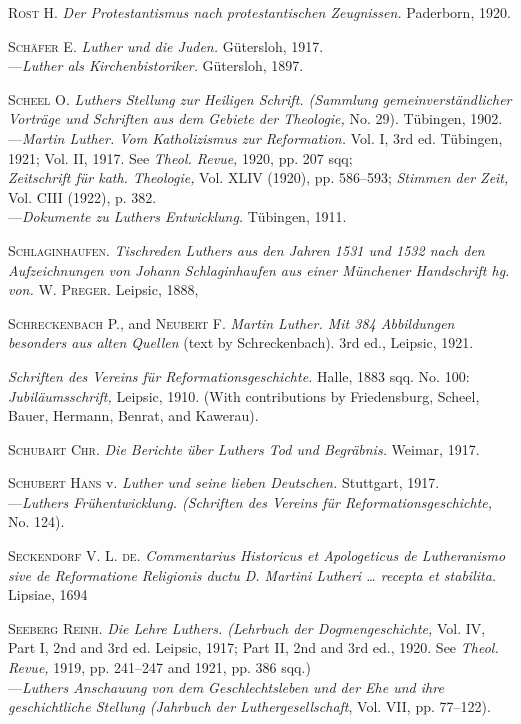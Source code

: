 \textsc{Rost H.} \textit{Der Protestantismus nach protestantischen Zeugnissen.} Paderborn,
1920.

\textsc{Schäfer E.} \textit{Luther und die Juden.} Gütersloh, 1917. \\
---\textit{Luther als Kirchenbistoriker.} Gütersloh, 1897.

\textsc{Scheel O.} \textit{Luthers Stellung zur Heiligen Schrift. (Sammlung gemeinverständlicher Vorträge und Schriften aus dem Gebiete der Theologie,} No.
29). Tübingen, 1902. \\
---\textit{Martin Luther. Vom Katholizismus zur Reformation.} Vol. I, 3rd ed.
Tübingen, 1921; Vol. II, 1917. See \textit{Theol. Revue,} 1920, pp. 207 sqq; \\
\textit{Zeitschrift für kath. Theologie,} Vol. XLIV (1920), pp. 586--593; \textit{Stimmen
der Zeit,} Vol. CIII (1922), p. 382. \\
---\textit{Dokumente zu Luthers Entwicklung.} Tübingen, 1911.

\textsc{Schlaginhaufen.} \textit{Tischreden Luthers aus den Jahren 1531 und 1532 nach
den Aufzeichnungen von Johann Schlaginhaufen aus einer Münchener
Handschrift hg. von.} \textsc{W. Preger.} Leipsic, 1888,

\textsc{Schreckenbach P.}, and \textsc{Neubert F.} \textit{Martin Luther. Mit 384 Abbildungen
besonders aus alten Quellen} (text by Schreckenbach). 3rd ed., Leipsic,
1921.

\textit{Schriften des Vereins für Reformationsgeschichte.} Halle, 1883 sqq. No. 100:
\textit{Jubiläumsschrift,} Leipsic, 1910. (With contributions by Friedensburg,
Scheel, Bauer, Hermann, Benrat, and Kawerau).

\textsc{Schubart Chr.} \textit{Die Berichte über Luthers Tod und Begräbnis.} Weimar,
1917.

\textsc{Schubert Hans} v. \textit{Luther und seine lieben Deutschen.} Stuttgart, 1917. \\
---\textit{Luthers Frühentwicklung. (Schriften des Vereins für Reformationsgeschichte,} No. 124).

\textsc{Seckendorf V. L. de.} \textit{Commentarius Historicus et Apologeticus de Lutheranismo sive de Reformatione Religionis ductu D. Martini Lutheri \dots
recepta et stabilita.} Lipsiae, 1694

\textsc{Seeberg Reinh.} \textit{Die Lehre Luthers. (Lehrbuch der Dogmengeschichte,} Vol.
IV, Part I, 2nd and 3rd ed. Leipsic, 1917; Part II, 2nd and 3rd ed., 1920.
See \textit{Theol. Revue,} 1919, pp. 241--247 and 1921, pp. 386 sqq.) \\
---\textit{Luthers Anschauung von dem Geschlechtsleben und der Ehe und ihre
geschichtliche Stellung (Jahrbuch der Luthergesellschaft}, Vol. VII, pp.
77--122).

